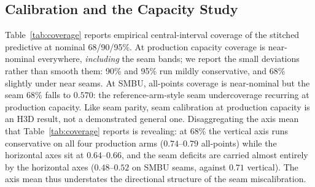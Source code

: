 \subsection{Calibration and the Capacity Study}
\label{sec:results:calibration}

 Table~\ref{tab:coverage} reports empirical central-interval coverage
of the stitched predictive at nominal 68/90/95\%. At production
capacity coverage is near-nominal everywhere, \emph{including} the
seam bands; we report the small deviations rather than smooth them:
90\% and 95\% run mildly conservative, and 68\% slightly under near
seams. At SMBU, all-points coverage is near-nominal but the seam 68\%
falls to $0.570$: the reference-arm-style seam undercoverage
recurring at production capacity. Like seam
parity, seam calibration at production capacity is an H3D result, not
a demonstrated general one. Disaggregating the axis mean that
Table~\ref{tab:coverage} reports is revealing: at 68\% the vertical axis runs
conservative on all four production arms ($0.74$--$0.79$ all-points)
while the horizontal axes sit at $0.64$--$0.66$, and the seam
deficits are carried almost entirely by the horizontal axes
($0.48$--$0.52$ on SMBU seams, against $0.71$ vertical). The axis
mean thus understates the directional structure of the seam
miscalibration.

